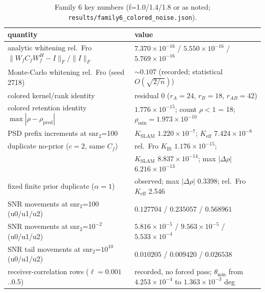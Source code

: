 \documentclass[12pt]{article}
\begin{document}
\begin{table}[htbp]
\centering
\small
\caption{Family 6 key numbers (f=1.0/1.4/1.8 or as noted;
\texttt{results/family6\_colored\_noise.json}).}
\label{tab:f6}
\begin{tabular}{l l}
\toprule
quantity & value \\
\midrule
analytic whitening rel.\ Fro
$\|W_fC_fW_f^H-I\|_F/\|I\|_F$ &
$7.370\times10^{-16}$ / $5.550\times10^{-16}$ / $5.769\times10^{-16}$ \\
Monte-Carlo whitening rel.\ Fro (seed 2718) &
$\sim0.107$ (recorded; statistical $O(\sqrt{2/n})$) \\
colored kernel/rank identity & residual 0 ($r_A=24$, $r_B=18$, $r_{AB}=42$) \\
colored retention identity $\max|\rho-\rho_{\mathrm{pred}}|$ &
$1.776\times10^{-15}$; count $\rho<1$ = 18; $\rho_{\min}=1.973\times10^{-10}$ \\
PSD prefix increments at snr$_2$=100 &
$K_{\mathrm{SLAM}}$ $1.220\times10^{-7}$; $K_{\mathrm{eff}}$ $7.424\times10^{-8}$ \\
duplicate no-prior ($c{=}2$, same $C_f$) &
rel.\ Fro $K_{\mathrm{IS}}$ $1.176\times10^{-15}$; \\
 & $K_{\mathrm{SLAM}}$ $8.837\times10^{-14}$; max $|\Delta\rho|$ $6.216\times10^{-13}$ \\
fixed finite prior duplicate ($\alpha{=}1$) & observed;
max $|\Delta\rho|$ $0.3398$; rel.\ Fro $K_{\mathrm{eff}}$ 2.546 \\
SNR movements at snr$_2$=100 (u0/u1/u2) &
$0.127704$ / $0.235057$ / $0.568961$ \\
SNR movements at snr$_2$=$10^{-2}$ (u0/u1/u2) &
$5.816\times10^{-5}$ / $9.563\times10^{-5}$ / $5.533\times10^{-4}$ \\
SNR tail movements at snr$_2$=$10^{10}$ (u0/u1/u2) &
$0.010205$ / $0.009420$ / $0.026538$ \\
receiver-correlation rows ($\ell=0.001$..0.5) & recorded, no forced pass;
$\theta_{\min}$ from $4.253\times10^{-4}$ to $1.363\times10^{-3}$ deg \\
\bottomrule
\end{tabular}
\end{table}
\end{document}
